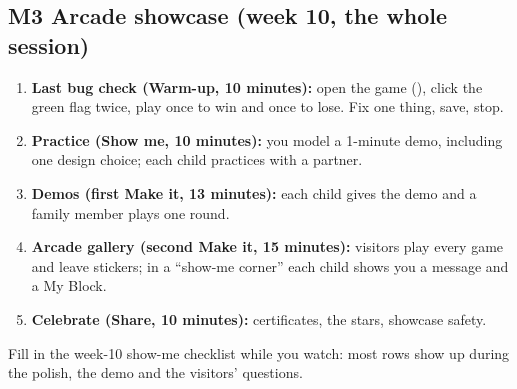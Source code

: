 \documentclass[track=junior,level=2,teacher]{kidscode}
\begin{document}
\subsection{M3 Arcade showcase (week 10, the whole session)}
\begin{enumerate}[itemsep=2pt]
  \item \textbf{Last bug check (Warm-up, 10 minutes):} open the game (), click the green flag twice, play once to win and once to lose. Fix one thing, save, stop.
  \item \textbf{Practice (Show me, 10 minutes):} you model a 1-minute demo, including one design choice;
        each child practices with a partner.
  \item \textbf{Demos (first Make it, 13 minutes):} each child gives the demo and a family member plays one round.
  \item \textbf{Arcade gallery (second Make it, 15 minutes):} visitors play every game and leave stickers;
        in a \enquote{show-me corner} each child shows you a message and a My Block.
  \item \textbf{Celebrate (Share, 10 minutes):} certificates, the stars, showcase safety.
\end{enumerate}
Fill in the week-10 show-me checklist while you watch: most rows show up during the polish, the demo
and the visitors' questions.

\end{document}
